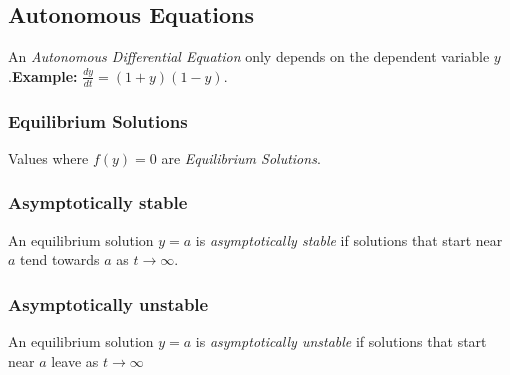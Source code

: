 \subsection{Autonomous Equations}

An \emph{Autonomous Differential Equation} only depends on the dependent
variable \(y\).\textbf{Example: } \(\frac{dy}{dt} = (1 + y)(1 -y)\).

\subsubsection{Equilibrium Solutions}
Values where \(f(y) = 0\) are \emph{Equilibrium Solutions}.

\subsubsection*{Asymptotically stable}
An equilibrium solution \(y = a\) is \emph{asymptotically stable} if solutions
that start near \(a\) tend towards \(a\) as \(t \to \infty\).

\subsubsection*{Asymptotically unstable}
An equilibrium solution \(y = a\) is \emph{asymptotically unstable} if solutions
that start near \(a\) leave as \(t \to \infty\)


\newpage